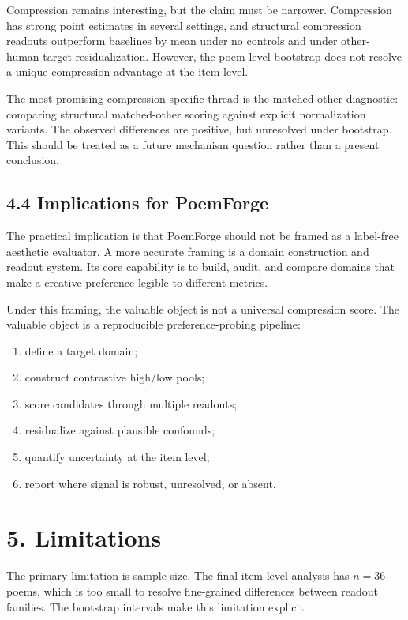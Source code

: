 \documentclass[11pt]{article}
\begin{document}
Compression remains interesting, but the claim must be narrower. Compression has strong point estimates in several settings, and structural compression readouts outperform baselines by mean under no controls and under other-human-target residualization. However, the poem-level bootstrap does not resolve a unique compression advantage at the item level.

The most promising compression-specific thread is the matched-other diagnostic: comparing structural matched-other scoring against explicit normalization variants. The observed differences are positive, but unresolved under bootstrap. This should be treated as a future mechanism question rather than a present conclusion.

\subsection{4.4 Implications for PoemForge}

The practical implication is that PoemForge should not be framed as a label-free aesthetic evaluator. A more accurate framing is a domain construction and readout system. Its core capability is to build, audit, and compare domains that make a creative preference legible to different metrics.

Under this framing, the valuable object is not a universal compression score. The valuable object is a reproducible preference-probing pipeline:

\begin{enumerate}
\item define a target domain;
\item construct contrastive high/low pools;
\item score candidates through multiple readouts;
\item residualize against plausible confounds;
\item quantify uncertainty at the item level;
\item report where signal is robust, unresolved, or absent.
\end{enumerate}

\section{5. Limitations}

The primary limitation is sample size. The final item-level analysis has \(n=36\) poems, which is too small to resolve fine-grained differences between readout families. The bootstrap intervals make this limitation explicit.
\end{document}
